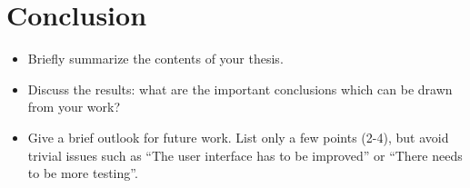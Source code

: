 \chapter{Conclusion}
\label{cha:concl}

\begin{itemize}
\item Briefly summarize the contents of your thesis.
\item Discuss the results: what are the important conclusions which can
be drawn from your work?
\item Give a brief outlook for future work. List only a few points (2-4),
      but avoid trivial issues such as ``The user interface has to be improved''
      or ``There needs to be more testing''.
\end{itemize}


